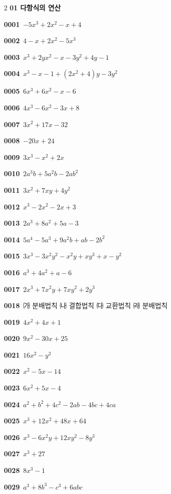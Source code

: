 \documentclass[10pt,a4paper]{article}
\begin{document}
\begin{multicols}{2}\small
\noindent\textbf{01 다항식의 연산}\par\smallskip
\noindent\textbf{0001}\ $-5x^3+2x^2-x+4$\par
\noindent\textbf{0002}\ $4-x+2x^2-5x^3$\par
\noindent\textbf{0003}\ $x^3+2yx^2-x-3y^2+4y-1$\par
\noindent\textbf{0004}\ $x^3-x-1+(2x^2+4)y-3y^2$\par
\noindent\textbf{0005}\ $6x^3+6x^2-x-6$\par
\noindent\textbf{0006}\ $4x^3-6x^2-3x+8$\par
\noindent\textbf{0007}\ $3x^2+17x-32$\par
\noindent\textbf{0008}\ $-20x+24$\par
\noindent\textbf{0009}\ $3x^3-x^2+2x$\par
\noindent\textbf{0010}\ $2a^3b+5a^2b-2ab^2$\par
\noindent\textbf{0011}\ $3x^2+7xy+4y^2$\par
\noindent\textbf{0012}\ $x^3-2x^2-2x+3$\par
\noindent\textbf{0013}\ $2a^3+8a^2+5a-3$\par
\noindent\textbf{0014}\ $5a^4-5a^3+9a^2b+ab-2b^2$\par
\noindent\textbf{0015}\ $3x^3-3x^2y^2-x^2y+xy^3+x-y^2$\par
\noindent\textbf{0016}\ $a^3+4a^2+a-6$\par
\noindent\textbf{0017}\ $2x^3+7x^2y+7xy^2+2y^3$\par
\noindent\textbf{0018}\ ㈎ 분배법칙 ㈏ 결합법칙 ㈐ 교환법칙 ㈑ 분배법칙\par
\noindent\textbf{0019}\ $4x^2+4x+1$\par
\noindent\textbf{0020}\ $9x^2-30x+25$\par
\noindent\textbf{0021}\ $16x^2-y^2$\par
\noindent\textbf{0022}\ $x^2-5x-14$\par
\noindent\textbf{0023}\ $6x^2+5x-4$\par
\noindent\textbf{0024}\ $a^2+b^2+4c^2-2ab-4bc+4ca$\par
\noindent\textbf{0025}\ $x^3+12x^2+48x+64$\par
\noindent\textbf{0026}\ $x^3-6x^2y+12xy^2-8y^3$\par
\noindent\textbf{0027}\ $x^3+27$\par
\noindent\textbf{0028}\ $8x^3-1$\par
\noindent\textbf{0029}\ $a^3+8b^3-c^3+6abc$\par

\end{multicols}
\end{document}
